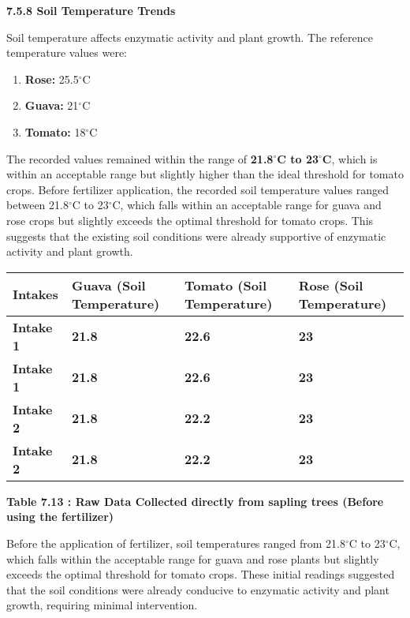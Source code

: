 \documentclass{book} %
\begin{document}
\noindent 

\noindent 

\noindent \textbf{7.5.8 Soil Temperature Trends}

\noindent Soil temperature affects enzymatic activity and plant growth. The reference temperature values were:

\begin{enumerate}
\item  \textbf{Rose:} 25.5$\mathrm{{}^\circ}$C

\item  \textbf{Guava:} 21$\mathrm{{}^\circ}$C

\item  \textbf{Tomato:} 18$\mathrm{{}^\circ}$C
\end{enumerate}

\noindent The recorded values remained within the range of \textbf{21.8$\boldsymbol{\mathrm{{}^\circ}}$C to 23$\boldsymbol{\mathrm{{}^\circ}}$C}, which is within an acceptable range but slightly higher than the ideal threshold for tomato crops. Before fertilizer application, the recorded soil temperature values ranged between 21.8$\mathrm{{}^\circ}$C to 23$\mathrm{{}^\circ}$C, which falls within an acceptable range for guava and rose crops but slightly exceeds the optimal threshold for tomato crops. This suggests that the existing soil conditions were already supportive of enzymatic activity and plant growth.

\noindent \textbf{}

\begin{tabular}{|p{0.7in}|p{0.7in}|p{0.8in}|p{0.7in}|} \hline 
\textbf{Intakes} & \textbf{Guava (Soil Temperature)} & \textbf{Tomato (Soil Temperature)} & \textbf{Rose (Soil Temperature)} \\ \hline 
\textbf{Intake 1} & \textbf{21.8} & \textbf{22.6} & \textbf{23} \\ \hline 
\textbf{Intake 1} & \textbf{21.8} & \textbf{22.6} & \textbf{23} \\ \hline 
\textbf{Intake 2} & \textbf{21.8} & \textbf{22.2} & \textbf{23} \\ \hline 
\textbf{Intake 2} & \textbf{21.8} & \textbf{22.2} & \textbf{23} \\ \hline 
\end{tabular}

\textbf{Table 7.13 : Raw Data Collected directly from sapling trees (Before using the fertilizer)}

\noindent Before the application of fertilizer, soil temperatures ranged from 21.8$\mathrm{{}^\circ}$C to 23$\mathrm{{}^\circ}$C, which falls within the acceptable range for guava and rose plants but slightly exceeds the optimal threshold for tomato crops. These initial readings suggested that the soil conditions were already conducive to enzymatic activity and plant growth, requiring minimal intervention.
\end{document}
